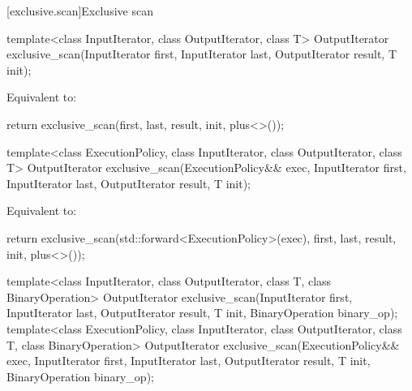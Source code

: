 [exclusive.scan]{Exclusive scan}

%
\begin{itemdecl}
template<class InputIterator, class OutputIterator, class T>
  OutputIterator exclusive_scan(InputIterator first, InputIterator last,
                                OutputIterator result,
                                T init);
\end{itemdecl}

\begin{itemdescr}
\pnum
\effects Equivalent to:
\begin{codeblock}
return exclusive_scan(first, last, result, init, plus<>());
\end{codeblock}
\end{itemdescr}

%
\begin{itemdecl}
template<class ExecutionPolicy, class InputIterator, class OutputIterator, class T>
  OutputIterator exclusive_scan(ExecutionPolicy&& exec,
                                InputIterator first, InputIterator last,
                                OutputIterator result,
                                T init);
\end{itemdecl}

\begin{itemdescr}
\pnum
\effects Equivalent to:
\begin{codeblock}
return exclusive_scan(std::forward<ExecutionPolicy>(exec), first, last, result, init, plus<>());
\end{codeblock}
\end{itemdescr}


%
\begin{itemdecl}
template<class InputIterator, class OutputIterator, class T, class BinaryOperation>
  OutputIterator exclusive_scan(InputIterator first, InputIterator last,
                                OutputIterator result,
                                T init, BinaryOperation binary_op);
template<class ExecutionPolicy, class InputIterator, class OutputIterator, class T, class BinaryOperation>
  OutputIterator exclusive_scan(ExecutionPolicy&& exec,
                                InputIterator first, InputIterator last,
                                OutputIterator result,
                                T init, BinaryOperation binary_op);
\end{itemdecl}

